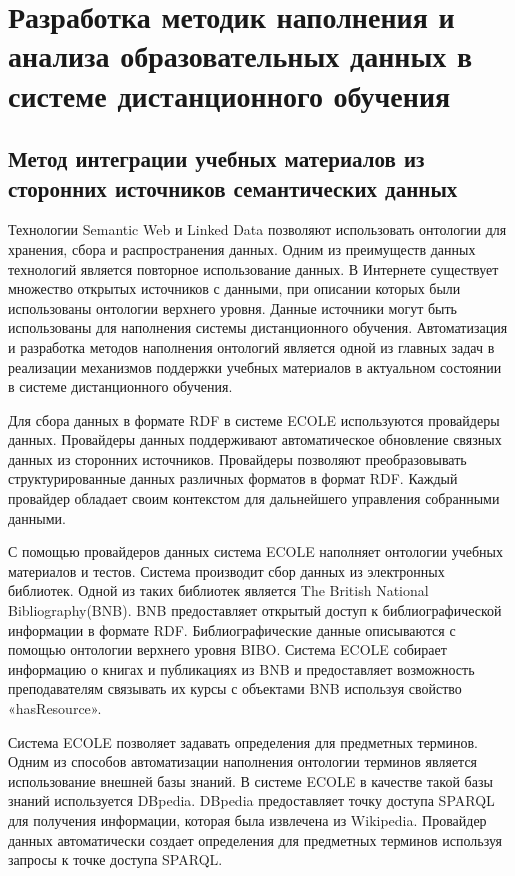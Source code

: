 \chapter{Разработка методик наполнения и анализа образовательных данных в системе дистанционного обучения} \label{chapt3}


\section{Метод интеграции учебных материалов из сторонних источников семантических данных} 
\label{sect3_1}

Технологии Semantic Web и Linked Data позволяют использовать онтологии для хранения, сбора и распространения данных. Одним из преимуществ данных технологий является повторное использование данных. В Интернете существует множество открытых источников с данными, при описании которых были использованы онтологии верхнего уровня. Данные источники могут быть использованы для наполнения системы дистанционного обучения. Автоматизация и разработка методов наполнения онтологий является одной из главных задач в реализации механизмов поддержки учебных материалов в актуальном состоянии в системе дистанционного обучения.

Для сбора данных в формате RDF в системе ECOLE используются провайдеры данных. Провайдеры данных поддерживают автоматическое обновление связных данных из сторонних источников. Провайдеры позволяют преобразовывать структурированные данных различных форматов в формат RDF. Каждый провайдер обладает своим контекстом для дальнейшего управления собранными данными. 

С помощью провайдеров данных система ECOLE наполняет онтологии учебных материалов и тестов. Система производит сбор данных из электронных библиотек. Одной из таких библиотек является The British National Bibliography(BNB). BNB предоставляет открытый доступ к библиографической информации в формате RDF. Библиографические данные описываются с помощью онтологии верхнего уровня BIBO. Система ECOLE собирает информацию о книгах и публикациях из BNB и предоставляет возможность преподавателям связывать их курсы с объектами BNB используя свойство «hasResource».

Система ECOLE позволяет задавать определения для предметных терминов. Одним из способов автоматизации наполнения онтологии терминов является использование внешней базы знаний. В системе ECOLE в качестве такой базы знаний используется DBpedia. DBpedia предоставляет точку доступа SPARQL для получения информации, которая была извлечена из Wikipedia. Провайдер данных автоматически создает определения для предметных терминов используя запросы к точке доступа SPARQL.


